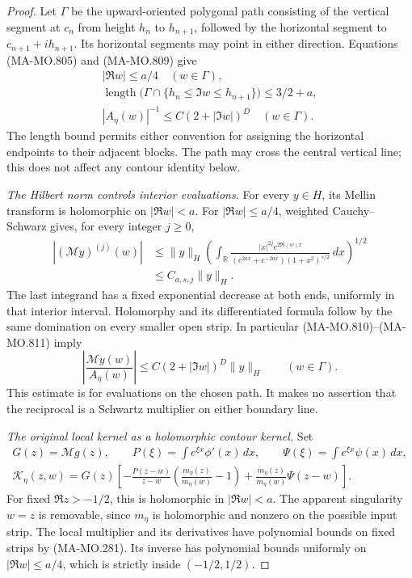 \begin{proof}
Let \(\Gamma\) be the upward-oriented polygonal path
consisting of the vertical segment at \(c_n\) from
height \(h_n\) to \(h_{n+1}\), followed by the
horizontal segment to \(c_{n+1}+ih_{n+1}\).
Its horizontal segments may point in either direction.
Equations (MA-MO.805) and (MA-MO.809) give
\[
 \begin{gathered}
 |\Re w|\le a/4\quad(w\in\Gamma),\\
 \operatorname{length}\bigl(\Gamma
          \cap\{h_n\le\Im w\le h_{n+1}\}\bigr)
                    \le 3/2+a,\\
                  |A_\eta(w)|^{-1}
                       \le C(2+|\Im w|)^D\quad(w\in\Gamma).
 \end{gathered}
 \tag{MA-MO.810}
\]
The length bound permits either convention for assigning
the horizontal endpoints to their adjacent blocks.
The path may cross the central vertical line; this
does not affect any contour identity below.

\emph{The Hilbert norm controls interior evaluations.}
For every \(y\in H\), its Mellin transform is holomorphic
on \(|\Re w|<a\). For \(|\Re w|\le a/4\),
weighted Cauchy--Schwarz gives, for every integer \(j\ge0\),
\[
 \begin{aligned}
 |(\mathcal My)^{(j)}(w)|
 &\le \|y\|_H
 \left(\int_{\mathbb R}
       \frac{|x|^{2j}e^{2\Re(w)x}}
       {(e^{2ax}+e^{-2ax})(1+x^2)^{s/2}}\,dx\right)^{1/2}\\
 &\le C_{a,s,j}\|y\|_H .
 \end{aligned}
 \tag{MA-MO.811}
\]
The last integrand has a fixed exponential decrease
at both ends, uniformly in that interior interval.
Holomorphy and its differentiated formula follow by
the same domination on every smaller open strip.
In particular (MA-MO.810)--(MA-MO.811) imply
\[
       \left|\frac{\mathcal My(w)}{A_\eta(w)}\right|
           \le C(2+|\Im w|)^D\|y\|_H
                                      \qquad(w\in\Gamma).
 \tag{MA-MO.812}
\]
This estimate is for evaluations on the chosen path.
It makes no assertion that the reciprocal is a
Schwartz multiplier on either boundary line.

\emph{The original local kernel as a holomorphic contour kernel.}
Set
\[
 \begin{gathered}
 G(z)=\mathcal Mg(z),\qquad
 P(\xi)=\int e^{\xi x}\phi'(x)\,dx,\qquad
 \Psi(\xi)=\int e^{\xi x}\psi(x)\,dx,\\
 \mathcal K_\eta(z,w)=G(z)\left[
   -\frac{P(z-w)}{z-w}
          \left(\frac{m_\eta(z)}{m_\eta(w)}-1\right)
       +\frac{m_\eta(z)}{m_\eta(w)}\Psi(z-w)\right].
 \end{gathered}
 \tag{MA-MO.813}
\]
For fixed \(\Re z>-1/2\), this is holomorphic in
\(|\Re w|<a\). The apparent singularity \(w=z\)
is removable, since \(m_\eta\) is holomorphic and
nonzero on the possible input strip.
The local multiplier and its derivatives have
polynomial bounds on fixed strips by (MA-MO.281).
Its inverse has polynomial bounds uniformly on
\(|\Re w|\le a/4\), which is strictly inside
\((-1/2,1/2)\).


\end{proof}
